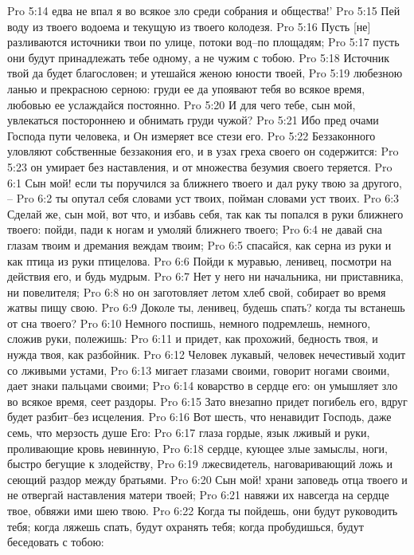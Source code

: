 Pro 5:14  едва не впал я во всякое зло среди собрания и общества!'
Pro 5:15  Пей воду из твоего водоема и текущую из твоего колодезя.
Pro 5:16  Пусть [не] разливаются источники твои по улице, потоки вод--по площадям;
Pro 5:17  пусть они будут принадлежать тебе одному, а не чужим с тобою.
Pro 5:18  Источник твой да будет благословен; и утешайся женою юности твоей,
Pro 5:19  любезною ланью и прекрасною серною: груди ее да упоявают тебя во всякое время, любовью ее услаждайся постоянно.
Pro 5:20  И для чего тебе, сын мой, увлекаться постороннею и обнимать груди чужой?
Pro 5:21  Ибо пред очами Господа пути человека, и Он измеряет все стези его.
Pro 5:22  Беззаконного уловляют собственные беззакония его, и в узах греха своего он содержится:
Pro 5:23  он умирает без наставления, и от множества безумия своего теряется.
Pro 6:1  Сын мой! если ты поручился за ближнего твоего и дал руку твою за другого, --
Pro 6:2  ты опутал себя словами уст твоих, пойман словами уст твоих.
Pro 6:3  Сделай же, сын мой, вот что, и избавь себя, так как ты попался в руки ближнего твоего: пойди, пади к ногам и умоляй ближнего твоего;
Pro 6:4  не давай сна глазам твоим и дремания веждам твоим;
Pro 6:5  спасайся, как серна из руки и как птица из руки птицелова.
Pro 6:6  Пойди к муравью, ленивец, посмотри на действия его, и будь мудрым.
Pro 6:7  Нет у него ни начальника, ни приставника, ни повелителя;
Pro 6:8  но он заготовляет летом хлеб свой, собирает во время жатвы пищу свою.
Pro 6:9  Доколе ты, ленивец, будешь спать? когда ты встанешь от сна твоего?
Pro 6:10  Немного поспишь, немного подремлешь, немного, сложив руки, полежишь:
Pro 6:11  и придет, как прохожий, бедность твоя, и нужда твоя, как разбойник.
Pro 6:12  Человек лукавый, человек нечестивый ходит со лживыми устами,
Pro 6:13  мигает глазами своими, говорит ногами своими, дает знаки пальцами своими;
Pro 6:14  коварство в сердце его: он умышляет зло во всякое время, сеет раздоры.
Pro 6:15  Зато внезапно придет погибель его, вдруг будет разбит--без исцеления.
Pro 6:16  Вот шесть, что ненавидит Господь, даже семь, что мерзость душе Его:
Pro 6:17  глаза гордые, язык лживый и руки, проливающие кровь невинную,
Pro 6:18  сердце, кующее злые замыслы, ноги, быстро бегущие к злодейству,
Pro 6:19  лжесвидетель, наговаривающий ложь и сеющий раздор между братьями.
Pro 6:20  Сын мой! храни заповедь отца твоего и не отвергай наставления матери твоей;
Pro 6:21  навяжи их навсегда на сердце твое, обвяжи ими шею твою.
Pro 6:22  Когда ты пойдешь, они будут руководить тебя; когда ляжешь спать, будут охранять тебя; когда пробудишься, будут беседовать с тобою:
